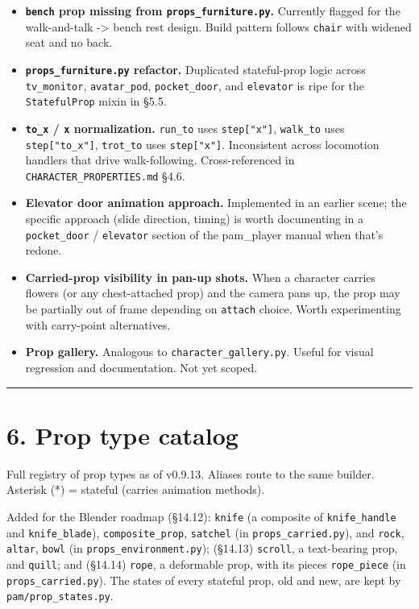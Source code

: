 \documentclass[
  12pt,
  letterpaper,
]{book}
\providecommand{\tightlist}{%
  \setlength{\itemsep}{0pt}\setlength{\parskip}{0pt}}
\begin{document}
\begin{itemize}
\tightlist
\item
  \textbf{\texttt{bench} prop missing from
  \texttt{props\_furniture.py}.} Currently flagged for the walk-and-talk
  -\textgreater{} bench rest design. Build pattern follows
  \texttt{chair} with widened seat and no back.
\item
  \textbf{\texttt{props\_furniture.py} refactor.} Duplicated
  stateful-prop logic across \texttt{tv\_monitor}, \texttt{avatar\_pod},
  \texttt{pocket\_door}, and \texttt{elevator} is ripe for the
  \texttt{StatefulProp} mixin in §5.5.
\item
  \textbf{\texttt{to\_x} / \texttt{x} normalization.} \texttt{run\_to}
  uses \texttt{step{[}"x"{]}}, \texttt{walk\_to} uses
  \texttt{step{[}"to\_x"{]}}, \texttt{trot\_to} uses
  \texttt{step{[}"x"{]}}. Inconsistent across locomotion handlers that
  drive walk-following. Cross-referenced in
  \texttt{CHARACTER\_PROPERTIES.md} §4.6.
\item
  \textbf{Elevator door animation approach.} Implemented in an earlier
  scene; the specific approach (slide direction, timing) is worth
  documenting in a \texttt{pocket\_door} / \texttt{elevator} section of
  the pam\_player manual when that's redone.
\item
  \textbf{Carried-prop visibility in pan-up shots.} When a character
  carries flowers (or any chest-attached prop) and the camera pans up,
  the prop may be partially out of frame depending on \texttt{attach}
  choice. Worth experimenting with carry-point alternatives.
\item
  \textbf{Prop gallery.} Analogous to \texttt{character\_gallery.py}.
  Useful for visual regression and documentation. Not yet scoped.
\end{itemize}

\begin{center}\rule{0.5\linewidth}{0.5pt}\end{center}

\section{6. Prop type catalog}\label{prop-type-catalog}

Full registry of prop types as of v0.9.13. Aliases route to the same
builder. Asterisk (*) = stateful (carries animation methods).

Added for the Blender roadmap (\S14.12): \texttt{knife} (a composite of
\texttt{knife\_handle} and \texttt{knife\_blade}),
\texttt{composite\_prop}, \texttt{satchel} (in
\texttt{props\_carried.py}), and \texttt{rock}, \texttt{altar},
\texttt{bowl} (in \texttt{props\_environment.py}); (\S14.13)
\texttt{scroll}, a text-bearing prop, and \texttt{quill}; and
(\S14.14) \texttt{rope}, a deformable prop, with its pieces
\texttt{rope\_piece} (in \texttt{props\_carried.py}). The states of every stateful prop, old
and new, are kept by \texttt{pam/prop\_states.py}.
\end{document}

